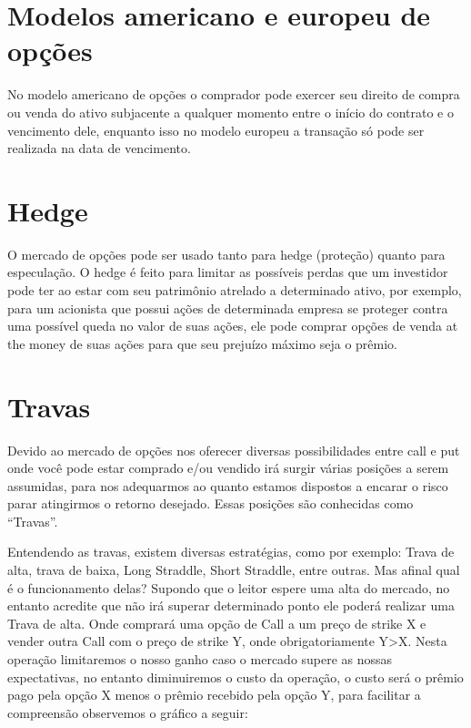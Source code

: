 \documentclass[]{book}
\begin{document}
\section{Modelos americano e europeu de
opções}\label{modelos-americano-e-europeu-de-opcoes}

No modelo americano de opções o comprador pode exercer seu direito de
compra ou venda do ativo subjacente a qualquer momento entre o início do
contrato e o vencimento dele, enquanto isso no modelo europeu a
transação só pode ser realizada na data de vencimento.

\section{Hedge}\label{hedge}

O mercado de opções pode ser usado tanto para hedge (proteção) quanto
para especulação. O hedge é feito para limitar as possíveis perdas que
um investidor pode ter ao estar com seu patrimônio atrelado a
determinado ativo, por exemplo, para um acionista que possui ações de
determinada empresa se proteger contra uma possível queda no valor de
suas ações, ele pode comprar opções de venda at the money de suas ações
para que seu prejuízo máximo seja o prêmio.

\section{Travas}\label{travas}

Devido ao mercado de opções nos oferecer diversas possibilidades entre
call e put onde você pode estar comprado e/ou vendido irá surgir várias
posições a serem assumidas, para nos adequarmos ao quanto estamos
dispostos a encarar o risco parar atingirmos o retorno desejado. Essas
posições são conhecidas como ``Travas''.

Entendendo as travas, existem diversas estratégias, como por exemplo:
Trava de alta, trava de baixa, Long Straddle, Short Straddle, entre
outras. Mas afinal qual é o funcionamento delas? Supondo que o leitor
espere uma alta do mercado, no entanto acredite que não irá superar
determinado ponto ele poderá realizar uma Trava de alta. Onde comprará
uma opção de Call a um preço de strike X e vender outra Call com o preço
de strike Y, onde obrigatoriamente Y\textgreater{}X. Nesta operação
limitaremos o nosso ganho caso o mercado supere as nossas expectativas,
no entanto diminuiremos o custo da operação, o custo será o prêmio pago
pela opção X menos o prêmio recebido pela opção Y, para facilitar a
compreensão observemos o gráfico a seguir:
\end{document}
